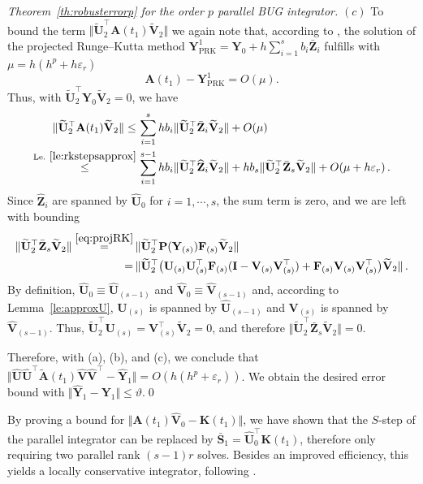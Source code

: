 \documentclass[preprint,runningheads]{svjour3}
\def\eps{\varepsilon}
\def\wh{\widehat}
\newcommand\bfI{{\mathbf I}}
\newcommand\bfA{{\mathbf A}}
\newcommand\bfF{{\mathbf F}}
\newcommand\bfK{{\mathbf K}}
\newcommand\bfP{{\mathbf P}}
\newcommand\bfS{{\mathbf S}}
\newcommand\bfU{{\mathbf U}}
\newcommand\bfV{{\mathbf V}}
\newcommand\bfY{{\mathbf Y}}
\newcommand\bfZ{{\mathbf Z}}
\def\eps{\varepsilon}
\begin{document}
\begin{proof}[Theorem~\ref{th:robusterrorp} for the order $p$ parallel BUG integrator]
$(c)$ To bound the term $\Vert \widetilde{\bfU}_2^{\top}\bfA(t_1)\widetilde{\bfV}_2\Vert$ we again note that, according to \cite[Theorem~6]{KiV19}, the solution of the projected Runge--Kutta method $\bfY^1_{\mathrm{PRK}} = \bfY_0 + h\sum_{i=1}^s b_i \bar \bfZ_i$ fulfills with $\mu=h(h^p+h\eps_r)$
$$
\bfA(t_1)-\bfY^1_{\mathrm{PRK}} = O(\mu).
$$
Thus, with $\widetilde{\bfU}_2^{\top}\bfY_0\widetilde{\bfV}_2 = 0$, we have
\begin{align*}
    \Vert \widetilde{\bfU}_2^{\top}\bfA(t_1)\widetilde{\bfV}_2\Vert \leq\,& \sum_{i=1}^s hb_i \Vert \widetilde{\bfU}_2^{\top}\bar \bfZ_i\widetilde{\bfV}_2\Vert + O(\mu)\\
    \stackrel{\text{Le}.~\ref{le:rkstepsapprox}}{\leq}\,&\sum_{i=1}^{s-1} hb_i \Vert \widetilde{\bfU}_2^{\top}\widehat \bfZ_i\widetilde{\bfV}_2\Vert + hb_s \Vert \widetilde{\bfU}_2^{\top}\bar \bfZ_s\widetilde{\bfV}_2\Vert + O(\mu + h\varepsilon_r)\,.
\end{align*}
Since $\widehat \bfZ_i$ are spanned by $\wh \bfU_0$ for $i = 1,\cdots,s$, the sum term is zero, and we are left with bounding
\begin{align*}
    \Vert \widetilde{\bfU}_2^{\top}\bar \bfZ_s\widetilde{\bfV}_2\Vert \stackrel{\eqref{eq:projRK}}{=} \,&\Vert \widetilde{\bfU}_2^{\top} \bfP(\bfY_{(s)})\bfF_{(s)} \widetilde{\bfV}_2\Vert \\
    =\,& \Vert \widetilde{\bfU}_2^{\top} \big(\bfU_{(s)}\bfU_{(s)}^{\top}\bfF_{(s)}(\bfI - \bfV_{(s)}\bfV_{(s)}^{\top}) + \bfF_{(s)}\bfV_{(s)}\bfV_{(s)}^{\top}\big) \widetilde{\bfV}_2\Vert\,.
\end{align*}
By definition, $\wh \bfU_0 \equiv \wh \bfU_{(s-1)}$ and $\wh \bfV_0 \equiv \wh \bfV_{(s-1)}$ and, according to Lemma~\ref{le:approxU}, $\bfU_{(s)}$ is spanned by $\wh \bfU_{(s-1)}$ and $\bfV_{(s)}$ is spanned by $\wh \bfV_{(s-1)}$. Thus, $\widetilde{\bfU}_2^{\top} \bfU_{(s)} = \bfV_{(s)}^{\top} \widetilde{\bfV}_2 = 0$, and therefore $\Vert \widetilde{\bfU}_2^{\top}\bar \bfZ_s\widetilde{\bfV}_2\Vert = 0$. 

Therefore, with (a), (b), and (c), we conclude that $\Vert \widehat \bfU\widehat{\bfU}^{\top}\widetilde \bfA(t_1)\widehat \bfV\widehat{\bfV}^{\top} -\wh\bfY_1 \Vert = O(h(h^p + \varepsilon_r))$. We obtain the desired error bound with $\Vert \wh\bfY_1 - \bfY_1 \Vert \leq \vartheta$.\qed
\end{proof}

\begin{remark}\label{re:local_cons_par}
    By proving a bound for $\Vert\bfA(t_1)\wh\bfV_0 - \bfK(t_1) \Vert$, we have shown that the $S$-step of the parallel integrator can be replaced by $\bar\bfS_1 = \wh\bfU_0^{\top}\bfK(t_1)$, therefore only requiring two parallel rank $(s-1)r$ solves. Besides an improved efficiency, this yields a locally conservative integrator, following \cite{einkemmer2023conservation}.
\end{remark}
\end{document}
